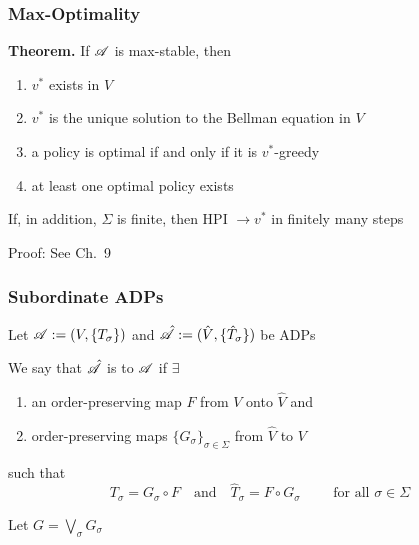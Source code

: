 \documentclass[dvipsnames]{beamer}
\begin{document}
\begin{frame}
    \frametitle{Max-Optimality}
    
    \begin{block}{\vspace*{-3ex}}
        {\bf Theorem.} If $\mathscr A$ is max-stable, then 
                \vspace{0.5em}
        \begin{enumerate}
            \item $v^*$ exists in $V$ 
                \vspace{0.5em}
            \item $v^*$ is the unique solution to the Bellman equation in $V$ 
                \vspace{0.5em}
            \item a policy is optimal if and only if it is $v^*$-greedy
                \vspace{0.5em}
            \item at least one optimal policy exists
        \end{enumerate}
                \vspace{0.5em}
                \vspace{0.5em}
        If, in addition, $\Sigma$ is finite, then HPI $\to v^*$ in finitely many steps
    \end{block}



    Proof: See Ch.~9

\end{frame}



\begin{frame}
    \frametitle{Subordinate ADPs}


    Let $\mathscr A := (V, \{T_\sigma\})$ and $\hat {\mathscr A} := (\hat V, \{\hat T_\sigma\})$ be
    ADPs

            \vspace{0.5em}
            \vspace{0.5em}
            \vspace{0.5em}
    We say that $\hat {\mathscr A}$ is  to $\mathscr A$ if $\exists$ 
    \begin{enumerate}
        \item an order-preserving map $F$ from $V$ onto $\hat V$ and
            \vspace{0.5em}
        \item order-preserving maps $\{G_\sigma\}_{\sigma \in \Sigma}$ from
            $\hat V$ to $V$
    \end{enumerate}

            \vspace{0.5em}
    such that
    \begin{equation*}
        T_\sigma = G_\sigma \circ F
        \quad \text{and} \quad
        \hat T_\sigma = F \circ G_\sigma 
        \qquad \text{ for all } \sigma \in \Sigma
    \end{equation*}


    Let $G = \bigvee_\sigma G_\sigma$

\end{frame}
\end{document}
